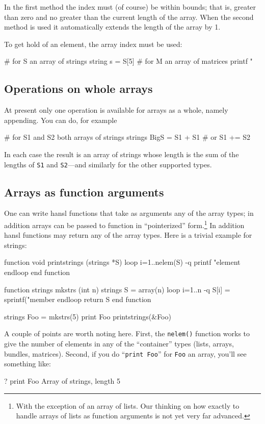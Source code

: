 In the first method the index must (of course) be within bounds; that
is, greater than zero and no greater than the current length of the
array. When the second method is used it automatically extends the
length of the array by 1.

To get hold of an element, the array index must be used:
\begin{code}
# for S an array of strings
string s = S[5]
# for M an array of matrices
printf "\n%
\end{code}

\subsection{Operations on whole arrays}

At present only one operation is available for arrays as a whole,
namely appending. You can do, for example
\begin{code}
# for S1 and S2 both arrays of strings
strings BigS = S1 + S1
# or
S1 += S2
\end{code}
In each case the result is an array of strings whose length is the sum
of the lengths of \texttt{S1} and \texttt{S2}---and similarly for the
other supported types.

\subsection{Arrays as function arguments}
\label{subsec:array-args}

One can write hansl functions that take as arguments any of the array
types; in addition arrays can be passed to function in ``pointerized''
form.\footnote{With the exception of an array of lists. Our thinking
  on how exactly to handle arrays of lists as function arguments is
  not yet very far advanced.} In addition hansl functions may return
any of the array types. Here is a trivial example for strings:
\begin{code}
function void printstrings (strings *S)
  loop i=1..nelem(S) -q
    printf "element %
  endloop
end function

function strings mkstrs (int n)
  strings S = array(n)
  loop i=1..n -q
    S[i] = sprintf("member %
  endloop
  return S
end function

strings Foo = mkstrs(5)
print Foo
printstrings(&Foo)
\end{code}

A couple of points are worth noting here. First, the \texttt{nelem()}
function works to give the number of elements in any of the
``container'' types (lists, arrays, bundles, matrices). Second, if you
do ``\texttt{print Foo}'' for \texttt{Foo} an array, you'll see
something like:
\begin{code}
? print Foo
Array of strings, length 5
\end{code}

